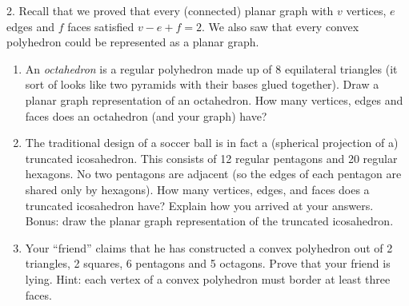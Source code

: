 \documentclass[10pt,]{book}
\theoremstyle{plain}
\theoremstyle{definition}
\theoremstyle{definition}
\theoremstyle{definition}
\numberwithin{equation}{chapter}
\begin{document}
\begin{exerciselist}
\begin{enumerate}[label=(\alph*)]
\end{enumerate}
\par\smallskip
\item[2.]\hypertarget{exercise-314}{}
            Recall that we proved that every (connected) planar graph with \(v\) vertices, \(e\) edges and \(f\) faces satisfied \(v - e + f = 2\). We also saw that every convex polyhedron could be represented as a planar graph.
\leavevmode%
\begin{enumerate}[label=(\alph*)]
\item\hypertarget{li-1300}{}
                An \emph{octahedron} is a regular polyhedron made up of 8 equilateral triangles (it sort of looks like two pyramids with their bases glued together). Draw a planar graph representation of an octahedron. How many vertices, edges and faces does an octahedron (and your graph) have?


\item\hypertarget{li-1301}{}
                The traditional design of a soccer ball is in fact a (spherical projection of a) truncated icosahedron. This consists of 12 regular pentagons and 20 regular hexagons. No two pentagons are adjacent (so the edges of each pentagon are shared only by hexagons). How many vertices, edges, and faces does a truncated icosahedron have? Explain how you arrived at your answers. Bonus: draw the planar graph representation of the truncated icosahedron.


\item\hypertarget{li-1302}{}
                Your ``friend'' claims that he has constructed a convex polyhedron out of 2 triangles, 2 squares, 6 pentagons and 5 octagons. Prove that your friend is lying. Hint: each vertex of a convex polyhedron must border at least three faces.



\end{enumerate}
\end{exerciselist}
\end{document}
